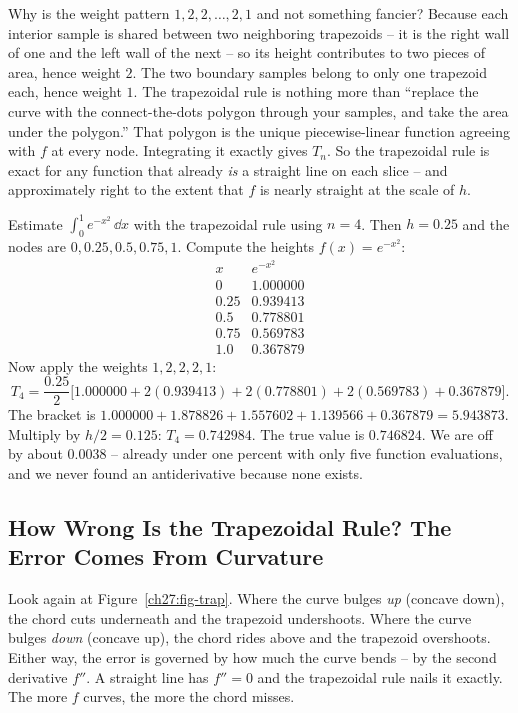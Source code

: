 \begin{whybox}
Why is the weight pattern $1,2,2,\dots,2,1$ and not something fancier? Because each interior sample is shared between two neighboring trapezoids -- it is the right wall of one and the left wall of the next -- so its height contributes to two pieces of area, hence weight $2$. The two boundary samples belong to only one trapezoid each, hence weight $1$. The trapezoidal rule is nothing more than ``replace the curve with the connect-the-dots polygon through your samples, and take the area under the polygon.'' That polygon is the unique piecewise-linear function agreeing with $f$ at every node. Integrating it exactly gives $T_n$. So the trapezoidal rule is exact for any function that already \emph{is} a straight line on each slice -- and approximately right to the extent that $f$ is nearly straight at the scale of $h$.
\end{whybox}

\begin{labbox}
Estimate $\int_0^1 e^{-x^2}\,\dd x$ with the trapezoidal rule using $n=4$. Then $h = 0.25$ and the nodes are $0, 0.25, 0.5, 0.75, 1$. Compute the heights $f(x) = e^{-x^2}$:
\[
\begin{array}{c|c}
x & e^{-x^2}\\\hline
0    & 1.000000\\
0.25 & 0.939413\\
0.5  & 0.778801\\
0.75 & 0.569783\\
1.0  & 0.367879
\end{array}
\]
Now apply the weights $1,2,2,2,1$:
\[
T_4 = \frac{0.25}{2}\Big[1.000000 + 2(0.939413) + 2(0.778801) + 2(0.569783) + 0.367879\Big].
\]
The bracket is $1.000000 + 1.878826 + 1.557602 + 1.139566 + 0.367879 = 5.943873$. Multiply by $h/2 = 0.125$: $T_4 = 0.742984$. The true value is $0.746824$. We are off by about $0.0038$ -- already under one percent with only five function evaluations, and we never found an antiderivative because none exists.
\end{labbox}

\subsection{How Wrong Is the Trapezoidal Rule? The Error Comes From Curvature}
\label{ch27:traperror}

Look again at Figure~\ref{ch27:fig-trap}. Where the curve bulges \emph{up} (concave down), the chord cuts underneath and the trapezoid undershoots. Where the curve bulges \emph{down} (concave up), the chord rides above and the trapezoid overshoots. Either way, the error is governed by how much the curve bends -- by the second derivative $f''$. A straight line has $f'' = 0$ and the trapezoidal rule nails it exactly. The more $f$ curves, the more the chord misses.

